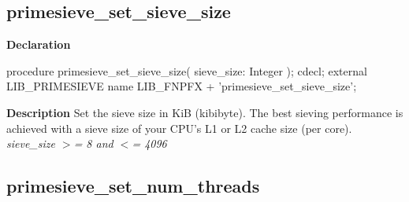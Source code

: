 \documentclass{report}
\newif\ifpdf
\begin{document}
\subsection*{primesieve{\_}set{\_}sieve{\_}size}
\fi
\label{primesieve-primesieve_set_sieve_size}
\begin{list}{}{
\setlength{\itemindent}{0cm}
\setlength{\listparindent}{0cm}
\setlength{\leftmargin}{\evensidemargin}
\addtolength{\leftmargin}{\tmplength}
\settowidth{\labelsep}{X}
\addtolength{\leftmargin}{\labelsep}
\setlength{\labelwidth}{\tmplength}
}
\item[\textbf{Declaration}\hfill]
\ifpdf
\begin{flushleft}
\fi
\begin{ttfamily}
procedure primesieve{\_}set{\_}sieve{\_}size( sieve{\_}size: Integer ); cdecl; external LIB{\_}PRIMESIEVE name LIB{\_}FNPFX + 'primesieve{\_}set{\_}sieve{\_}size';\end{ttfamily}

\ifpdf
\end{flushleft}
\fi

\par
\item[\textbf{Description}]
Set the sieve size in KiB (kibibyte). The best sieving performance is achieved with a sieve size of your CPU's L1 or L2 cache size (per core). \textit{sieve{\_}size {$>$}= 8 and {$<$}= 4096}

\end{list}
\ifpdf
\subsection*{\large{\textbf{primesieve{\_}set{\_}num{\_}threads}}\normalsize\hspace{1ex}\hrulefill}
\else
\end{document}
